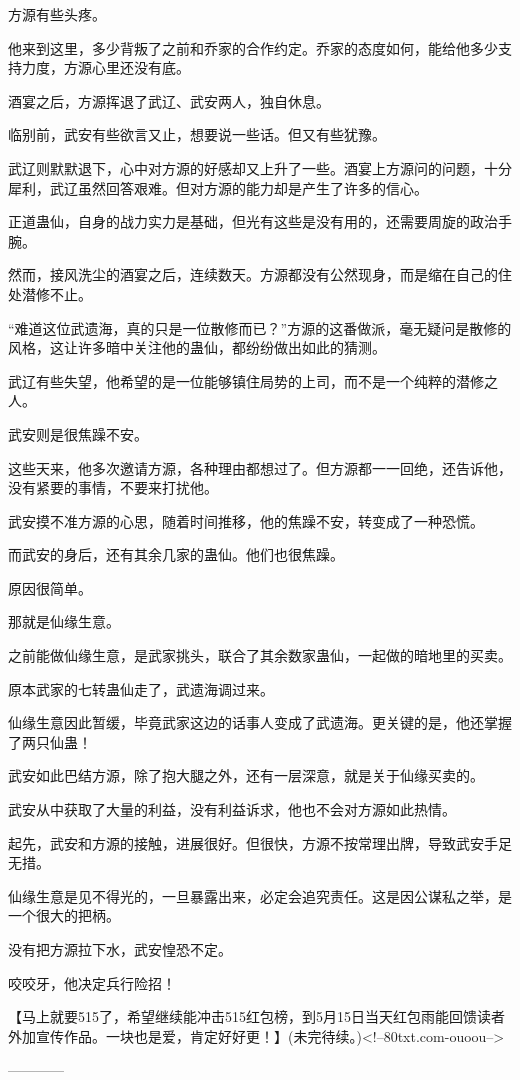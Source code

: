\begin{this_body}
方源有些头疼。

他来到这里，多少背叛了之前和乔家的合作约定。乔家的态度如何，能给他多少支持力度，方源心里还没有底。

酒宴之后，方源挥退了武辽、武安两人，独自休息。

临别前，武安有些欲言又止，想要说一些话。但又有些犹豫。

武辽则默默退下，心中对方源的好感却又上升了一些。酒宴上方源问的问题，十分犀利，武辽虽然回答艰难。但对方源的能力却是产生了许多的信心。

正道蛊仙，自身的战力实力是基础，但光有这些是没有用的，还需要周旋的政治手腕。

然而，接风洗尘的酒宴之后，连续数天。方源都没有公然现身，而是缩在自己的住处潜修不止。

“难道这位武遗海，真的只是一位散修而已？”方源的这番做派，毫无疑问是散修的风格，这让许多暗中关注他的蛊仙，都纷纷做出如此的猜测。

武辽有些失望，他希望的是一位能够镇住局势的上司，而不是一个纯粹的潜修之人。

武安则是很焦躁不安。

这些天来，他多次邀请方源，各种理由都想过了。但方源都一一回绝，还告诉他，没有紧要的事情，不要来打扰他。

武安摸不准方源的心思，随着时间推移，他的焦躁不安，转变成了一种恐慌。

而武安的身后，还有其余几家的蛊仙。他们也很焦躁。

原因很简单。

那就是仙缘生意。

之前能做仙缘生意，是武家挑头，联合了其余数家蛊仙，一起做的暗地里的买卖。

原本武家的七转蛊仙走了，武遗海调过来。

仙缘生意因此暂缓，毕竟武家这边的话事人变成了武遗海。更关键的是，他还掌握了两只仙蛊！

武安如此巴结方源，除了抱大腿之外，还有一层深意，就是关于仙缘买卖的。

武安从中获取了大量的利益，没有利益诉求，他也不会对方源如此热情。

起先，武安和方源的接触，进展很好。但很快，方源不按常理出牌，导致武安手足无措。

仙缘生意是见不得光的，一旦暴露出来，必定会追究责任。这是因公谋私之举，是一个很大的把柄。

没有把方源拉下水，武安惶恐不定。

咬咬牙，他决定兵行险招！

【马上就要515了，希望继续能冲击515红包榜，到5月15日当天红包雨能回馈读者外加宣传作品。一块也是爱，肯定好好更！】(未完待续。)<!--80txt.com-ouoou-->

------------

\end{this_body}

